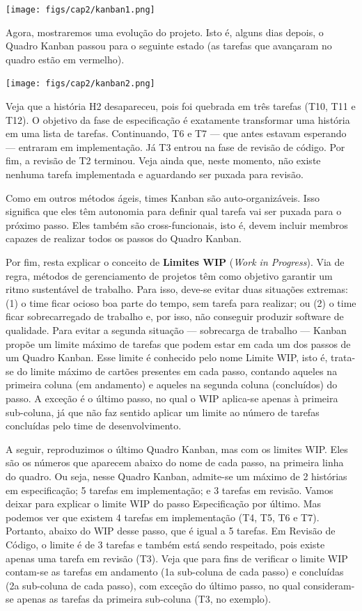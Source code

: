 \documentclass[
  11pt,
  twoside]{book}
\begin{document}
\texttt{[image: figs/cap2/kanban1.png]}

Agora, mostraremos uma evolução do projeto. Isto é, alguns dias depois,
o Quadro Kanban passou para o seguinte estado (as tarefas que avançaram
no quadro estão em vermelho).

\texttt{[image: figs/cap2/kanban2.png]}

Veja que a história H2 desapareceu, pois foi quebrada em três tarefas
(T10, T11 e T12). O objetivo da fase de especificação é exatamente
transformar uma história em uma lista de tarefas. Continuando, T6 e T7
--- que antes estavam esperando --- entraram em implementação. Já T3
entrou na fase de revisão de código. Por fim, a revisão de T2 terminou.
Veja ainda que, neste momento, não existe nenhuma tarefa implementada e
aguardando ser puxada para revisão.

Como em outros métodos ágeis, times Kanban são auto-organizáveis. Isso
significa que eles têm autonomia para definir qual tarefa vai ser puxada
para o próximo passo. Eles também são cross-funcionais, isto é, devem
incluir membros capazes de realizar todos os passos do Quadro Kanban.

 
  Por
fim, resta explicar o conceito de \textbf{Limites WIP} (\emph{Work in
Progress}). Via de regra, métodos de gerenciamento de projetos têm como
objetivo garantir um ritmo sustentável de trabalho. Para isso, deve-se
evitar duas situações extremas: (1) o time ficar ocioso boa parte do
tempo, sem tarefa para realizar; ou (2) o time ficar sobrecarregado de
trabalho e, por isso, não conseguir produzir software de qualidade. Para
evitar a segunda situação --- sobrecarga de trabalho --- Kanban propõe
um limite máximo de tarefas que podem estar em cada um dos passos de um
Quadro Kanban. Esse limite é conhecido pelo nome Limite WIP, isto é,
trata-se do limite máximo de cartões presentes em cada passo, contando
aqueles na primeira coluna (em andamento) e aqueles na segunda coluna
(concluídos) do passo. A exceção é o último passo, no qual o WIP
aplica-se apenas à primeira sub-coluna, já que não faz sentido aplicar
um limite ao número de tarefas concluídas pelo time de desenvolvimento.

A seguir, reproduzimos o último Quadro Kanban, mas com os limites WIP.
Eles são os números que aparecem abaixo do nome de cada passo, na
primeira linha do quadro. Ou seja, nesse Quadro Kanban, admite-se um
máximo de 2 histórias em especificação; 5 tarefas em implementação; e 3
tarefas em revisão. Vamos deixar para explicar o limite WIP do passo
Especificação por último. Mas podemos ver que existem 4 tarefas em
implementação (T4, T5, T6 e T7). Portanto, abaixo do WIP desse passo,
que é igual a 5 tarefas. Em Revisão de Código, o limite é de 3 tarefas e
também está sendo respeitado, pois existe apenas uma tarefa em revisão
(T3). Veja que para fins de verificar o limite WIP contam-se as tarefas
em andamento (1a sub-coluna de cada passo) e concluídas (2a sub-coluna
de cada passo), com exceção do último passo, no qual consideram-se
apenas as tarefas da primeira sub-coluna (T3, no exemplo).
\end{document}
